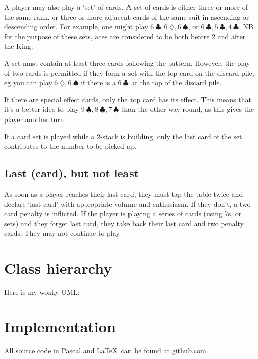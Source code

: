 \documentclass{article}
\begin{document}
    A player may also play a `set' of cards. A set of cards is either three or
    more of the same rank, or three or more adjacent cards of the same suit in
    ascending or descending order. For example, one might play
    $6\ \clubsuit, 6\ \diamondsuit, 6\ \spadesuit$, or
    $6\ \clubsuit, 5\ \clubsuit, 4\ \clubsuit$. NB for the purpose of these
    sets, aces are considered to be both before 2 and after the King.

    A set must contain at least three cards following the pattern. However, the
    play of two cards is permitted if they form a set with the top card on the
    discard pile, eg you can play $6\ \diamondsuit, 6\ \spadesuit$ if there is a 
    $6\ \clubsuit$ at the top of the discard pile.

    If there are special effect cards, only the top card has its effect. This
    means that it's a better idea to play
    $9\ \clubsuit, 8\ \clubsuit, 7\ \clubsuit$
    than the other way round, as this gives the player another turn.

    If a card set is played while a 2-stack is building, only the last card of
    the set contributes to the number to be picked up.

    \subsection{Last (card), but not least} \label{rule:lastcard}

    As soon as a player reaches their last card, they must tap the table twice
    and declare `last card' with appropriate volume and enthusiasm. If they
    don't, a two-card penalty is inflicted. If the player is playing a series
    of cards (using 7s, or sets) and they forget last card, they take back
    their last card and two penalty cards. They may not continue to play.

    \section{Class hierarchy}

    Here is my wonky UML:



    \section{Implementation}


    All source code in Pascal and \LaTeX\ can be found at \url{github.com}.
\end{document}
